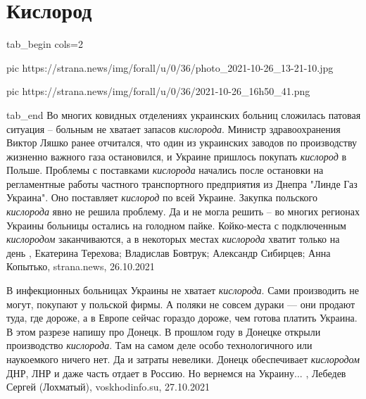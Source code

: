  
 
 
 
 
\chapter{Кислород}

\ifcmt
  tab_begin cols=2

     pic https://strana.news/img/forall/u/0/36/photo_2021-10-26_13-21-10.jpg

     pic https://strana.news/img/forall/u/0/36/2021-10-26_16h50_41.png

  tab_end
\fi
Во многих ковидных отделениях украинских больниц сложилась патовая ситуация –
больным не хватает запасов \emph{кислорода}.  Министр здравоохранения Виктор Ляшко
ранее отчитался, что один из украинских заводов по производству жизненно
важного газа остановился, и Украине пришлось покупать \emph{кислород} в Польше.
Проблемы с поставками \emph{кислорода} начались после остановки на регламентные работы
частного транспортного предприятия из Днепра "Линде Газ Украина". Оно
поставляет \emph{кислород} по всей Украине.  Закупка польского \emph{кислорода} явно не
решила проблему. Да и не могла решить – во многих регионах Украины больницы
остались на голодном пайке. Койко-места с подключенным \emph{кислородом}
заканчиваются, а в некоторых местах \emph{кислорода} хватит только на день
, 
Екатерина Терехова; Владислав Бовтрук; Александр Сибирцев; Анна Копытько, strana.news, 26.10.2021

В инфекционных больницах Украины не хватает \emph{кислорода}. Сами производить не
могут, покупают у польской фирмы. А поляки не совсем дураки — они продают туда,
где дороже, а в Европе сейчас гораздо дороже, чем готова платить Украина. В
этом разрезе напишу про Донецк. В прошлом году в Донецке открыли производство
\emph{кислорода}. Там на самом деле особо технологичного или наукоемкого ничего нет.
Да и затраты невелики. Донецк обеспечивает \emph{кислородом} ДНР, ЛНР и даже часть
отдает в Россию. Но вернемся на Украину...
, 
Лебедев Сергей (Лохматый), voskhodinfo.su, 27.10.2021
